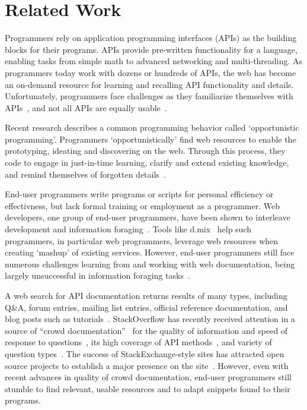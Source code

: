 \section{Related Work}

Programmers rely on application programming interfaces (APIs) as the building blocks for their programs.
APIs provide pre-written functionality for a language, enabling tasks from simple math to advanced networking and multi-threading.
As programmers today work with dozens or hundreds of APIs, the web has become an on-demand resource for learning and recalling API functionality and details.
Unfortunately, programmers face challenges as they familiarize themselves with APIs~\cite{Duala-Ekoko-Asking}, and not all APIs are equally usable~\cite{de_Souza-Automatic}.

Recent research describes a common programming behavior called `opportunistic programming'.
Programmers `opportunistically' find web resources to enable the prototyping, ideating and discovering on the web.
Through this process, they code to engage in just-in-time learning, clarify and extend existing knowledge, and remind themselves of forgotten details~\cite{Brandt-Opportunistic}.

End-user programmers write programs or scripts for personal efficiency or effectivness, but lack formal training or employment as a programmer.
Web developers, one group of end-user programmers, have been shown to interleave development and information foraging~\cite{Dorn-Interleaved}.
Tools like d.mix~\cite{Hartmann-Dmix} help such programmers, in particular web programmers, leverage web resources when creating `mashup' of existing services.
However, end-user programmers still face numerous challenges learning from and working with web documentation, being largely unsuccessful in information foraging tasks~\cite{Dorn-Lost}.

A web search for API documentation returns results of many types, including Q\&A, forum entries, mailing list entries, official reference documentation, and blog posts such as tutorials~\cite{Parnin-Measuring}.
StackOverflow has recently received attention in a source of ``crowd documentation''~\cite{Parnin-Crowd} for the quality of information and speed of response to questions~\cite{Mamykina-Fastest}, its high coverage of API methods~\cite{Parnin-Crowd}, and variety of question types~\cite{Nasehi-What}.
The success of StackExchange-style sites has attracted open source projects to establish a major presence on the site~\cite{Vasilescu-How}.
However, even with recent advances in quality of crowd documentation, end-user programmers still stumble to find relevant, usable resources and to adapt snippets found to their programs.

